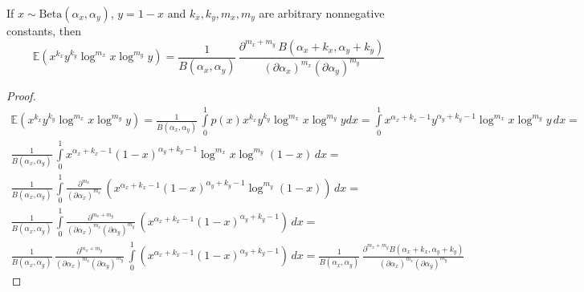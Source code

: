 \documentclass{article}
\begin{document}
\begin{theorem}
	If $x \sim \textrm{Beta}(\alpha_x, \alpha_y)$, $y = 1 - x$ and $k_x, k_y, m_x, m_y$ are arbitrary nonnegative constants, then 
	\begin{equation}
	\mathbb{E}(x^{k_x} y^{k_y} \log^{m_x} x \log^{m_y} y) = \frac{1}{B(\alpha_x, \alpha_y)} \, \frac{\partial^{m_x + m_y} \, B(\alpha_x + k_x, \alpha_y + k_y)}{(\partial \alpha_x)^{m_x} (\partial \alpha_y)^{m_y}}
	\end{equation}
	\begin{proof}
		
		\begin{multline*}
		\mathbb{E}(x^{k_x} y^{k_y} \log^{m_x} x \log^{m_y} y) = 
		\frac{1}{B(\alpha_x, \alpha_y)} \, \int\limits_0^1{p(x) x^{k_x} y^{k_y} \log^{m_x} x \log^{m_y} y dx} = \int\limits_0^1{x^{\alpha_x + k_x - 1} y^{\alpha_y + k_y - 1} \log^{m_x} x \log^{m_y} y \, dx} = 
		\\ \frac{1}{B(\alpha_x, \alpha_y)} \, \int\limits_0^1{x^{\alpha_x + k_x - 1} (1 - x)^{\alpha_y + k_y - 1} \log^{m_x} x \log^{m_y} (1 - x) \, dx} = 
		\\ \frac{1}{B(\alpha_x, \alpha_y)} \, \int\limits_0^1{ \frac{\partial^{m_x}}{(\partial \alpha_x)^{m_x}} \, (x^{\alpha_x + k_x - 1} (1 - x)^{\alpha_y + k_y - 1} \log^{m_y} (1 - x)) \, dx} = 
		\\ \frac{1}{B(\alpha_x, \alpha_y)} \, \int\limits_0^1{ \frac{\partial^{m_x + m_y}}{(\partial \alpha_x)^{m_x} (\partial \alpha_y)^{m_y}} \, (x^{\alpha_x + k_x - 1} (1 - x)^{\alpha_y + k_y - 1}) \, dx} = 
		\\ \frac{1}{B(\alpha_x, \alpha_y)} \, \frac{\partial^{m_x + m_y}}{(\partial \alpha_x)^{m_x} (\partial \alpha_y)^{m_y}} \, \int\limits_0^1{  (x^{\alpha_x + k_x - 1} (1 - x)^{\alpha_y + k_y - 1}) \, dx} = 
		\frac{1}{B(\alpha_x, \alpha_y)} \, \frac{\partial^{m_x + m_y} B(\alpha_x + k_x, \alpha_y + k_y)}{(\partial \alpha_x)^{m_x} (\partial \alpha_y)^{m_y}} 
		\end{multline*}
	\end{proof}
\end{theorem}
\end{document}
